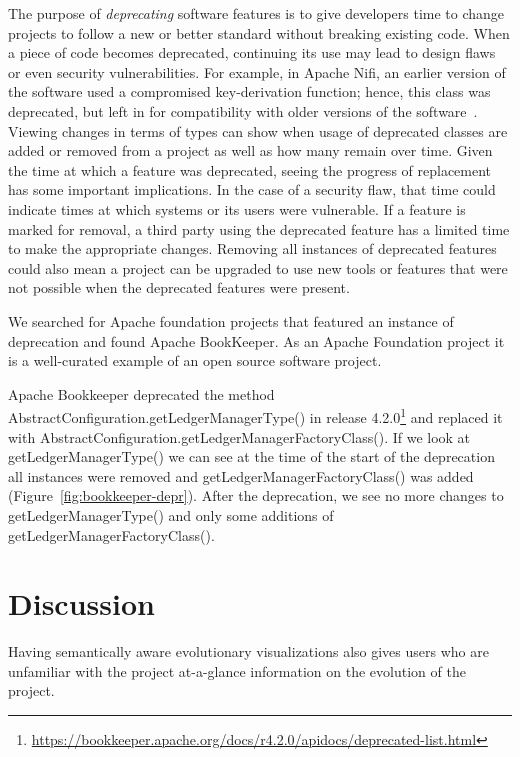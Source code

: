 The purpose of \emph{deprecating} software features is to give developers time to change projects to follow a new or better standard without breaking existing code. When a piece of code becomes deprecated, continuing its use may lead to design flaws or even security vulnerabilities. For example, in Apache Nifi, an earlier version of the software used a compromised key-derivation function; hence, this class was deprecated, but left in for compatibility with older versions of the software~\cite{nifi}. Viewing changes in terms of types can show when usage of deprecated classes are added or removed from a project as well as how many remain over time. Given the time at which a feature was deprecated, seeing the progress of replacement has some important implications. In the case of a security flaw, that time could indicate times at which systems or its users were vulnerable. If a feature is marked for removal, a third party using the deprecated feature has a limited time to make the appropriate changes. Removing all instances of deprecated features could also mean a project can be upgraded to use new tools or features that were not possible when the deprecated features were present.

We searched for Apache foundation projects that featured an instance of deprecation and found Apache BookKeeper. As an Apache Foundation project it is a well-curated example of an open source software project.

Apache Bookkeeper deprecated the method Abstract\-Configuration.\-get\-Ledger\-Manager\-Type() in release 4.2.0\footnote{\url{https://bookkeeper.apache.org/docs/r4.2.0/apidocs/deprecated-list.html}} and replaced it with Abstract\-Configuration.\-get\-Ledger\-Manager\-Factory\-Class(). If we look at get\-Ledger\-Manager\-Type() we can see at the time of the start of the deprecation all instances were removed and get\-Ledger\-Manager\-Factory\-Class() was added (Figure~\ref{fig:bookkeeper-depr}). After the deprecation, we see no more changes to get\-Ledger\-Manager\-Type() and only some additions of get\-Ledger\-Manager\-Factory\-Class().

\section{Discussion}

Having semantically aware evolutionary visualizations also gives users who are unfamiliar with the project at-a-glance information on the evolution of the project.

